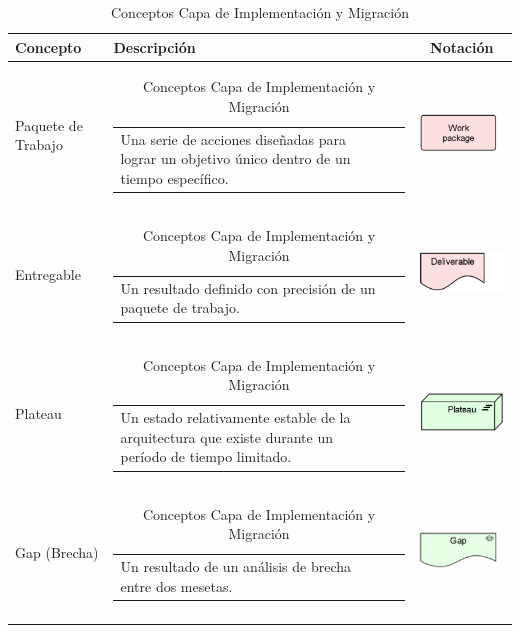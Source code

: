 \begin{longtable}[c]{|p{2.5cm}|l|c|}

	\hline
	\textbf{Concepto} 			& \textbf{Descripción}                                                                                                                                            & \textbf{Notación} \\ \hline
	\endhead
	Paquete de Trabajo			& \begin{tabular}[c]{p{7cm}@{}l@{}}Una serie de acciones diseñadas para lograr un objetivo único dentro de un tiempo específico.\end{tabular}                                                    & \includegraphics[width=35mm]{arquitectura/adm_lenguaje/imgs/implementacionMigration/WorkPackage}           \\ \hline
	Entregable					& \begin{tabular}[c]{p{7cm}@{}l@{}}Un resultado definido con precisión de un paquete de trabajo.\end{tabular} & \includegraphics[width=35mm]{arquitectura/adm_lenguaje/imgs/implementacionMigration/Deliverable}          \\ \hline
	Plateau						& \begin{tabular}[c]{p{7cm}@{}l@{}}Un estado relativamente estable de la arquitectura que existe durante un período de tiempo limitado.\end{tabular} & \includegraphics[width=35mm]{arquitectura/adm_lenguaje/imgs/implementacionMigration/Plateau}          \\ \hline
	Gap (Brecha)	   			& \begin{tabular}[c]{p{7cm}@{}l@{}}Un resultado de un análisis de brecha entre dos mesetas.\end{tabular} & \includegraphics[width=35mm]{arquitectura/adm_lenguaje/imgs/implementacionMigration/Gap}          \\ \hline
	\caption{Conceptos Capa de Implementación y Migración \cite{WEB7}}
\end{longtable}
